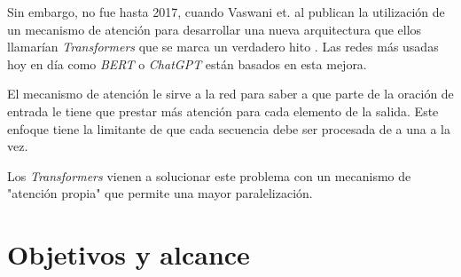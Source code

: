 Sin embargo, no fue hasta 2017, cuando Vaswani et. al publican la utilización de un mecanismo de atención para desarrollar una nueva arquitectura que ellos llamarían \textit{Transformers} que se marca un verdadero hito \citep{ARTICLE:5}. Las redes más usadas hoy en día como \textit{BERT} o \textit{ChatGPT} están basados en esta mejora.

El mecanismo de atención le sirve a la red para saber a que parte de la oración de entrada le tiene que prestar más atención para cada elemento de la salida. Este enfoque tiene la limitante de que cada secuencia debe ser procesada de a una a la vez.

Los \textit{Transformers} vienen a solucionar este problema con un mecanismo de "atención propia" que permite una mayor paralelización.



\section{Objetivos y alcance}


